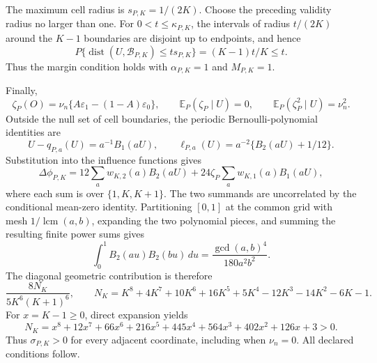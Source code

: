The maximum cell radius is \(s_{P,K}=1/(2K)\).  Choose the preceding validity radius no larger than one.  For \(0<t\leq\kappa_{P,K}\), the intervals of radius \(t/(2K)\) around the \(K-1\) boundaries are disjoint up to endpoints, and hence
\[
 P\{\operatorname{dist}(U,\mathcal B_{P,K})\leq ts_{P,K}\}
 =(K-1)t/K\leq t.
\]
Thus the margin condition holds with \(\alpha_{P,K}=1\) and \(M_{P,K}=1\).

Finally,
\[
 \zeta_P(O)=\nu_n\{A\varepsilon_1-(1-A)\varepsilon_0\},\qquad
 \mathbb E_P(\zeta_P\mid U)=0,\qquad
 \mathbb E_P(\zeta_P^2\mid U)=\nu_n^2.
\]
Outside the null set of cell boundaries, the periodic Bernoulli-polynomial identities are
\[
 U-q_{P,a}(U)=a^{-1}B_1(aU),\qquad
 \ell_{P,a}(U)=a^{-2}\{B_2(aU)+1/12\}.
\]
Substitution into the influence functions gives
\[
 \Delta\phi_{P,K}
 =12\sum_aw_{K,2}(a)B_2(aU)
 +24\zeta_P\sum_aw_{K,1}(a)B_1(aU),
\]
where each sum is over \(\{1,K,K+1\}\).  The two summands are uncorrelated by the conditional mean-zero identity.  Partitioning \([0,1]\) at the common grid with mesh \(1/\operatorname{lcm}(a,b)\), expanding the two polynomial pieces, and summing the resulting finite power sums gives
\[
 \int_0^1B_2(au)B_2(bu)\,du=\frac{\gcd(a,b)^4}{180a^2b^2}.
\]
The diagonal geometric contribution is therefore
\[
 \frac{8N_K}{5K^6(K+1)^6},\qquad
 N_K=K^8+4K^7+10K^6+16K^5+5K^4-12K^3-14K^2-6K-1.
\]
For \(x=K-1\geq0\), direct expansion yields
\[
 N_K=x^8+12x^7+66x^6+216x^5+445x^4+564x^3+402x^2+126x+3>0.
\]
Thus \(\sigma_{P,K}>0\) for every adjacent coordinate, including when \(\nu_n=0\).  All declared conditions follow.